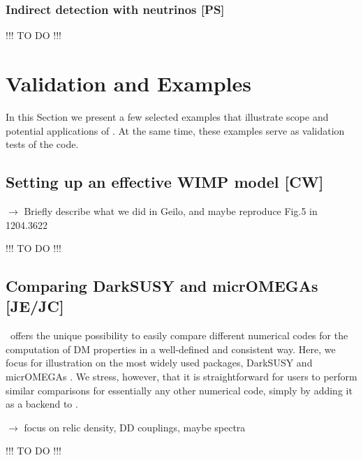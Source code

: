 \subsubsection{Indirect detection with neutrinos {\bf [PS]}}
\label{code_nu}
\smallskip
{\color{red} !!! TO DO !!!}
\smallskip




\section{Validation and  Examples}
\label{examples}

In this Section we present a few selected  examples that illustrate scope and
potential applications of \DB. At the same time, these examples serve as validation
tests of the code.


\subsection{Setting up an effective WIMP model {\bf [CW]}}

$\to$ Briefly describe what we did in Geilo, and maybe reproduce Fig.5 in 1204.3622

\smallskip
{\color{red} !!! TO DO !!!}
\smallskip


\subsection{Comparing {\sf DarkSUSY} and {\sf micrOMEGAs} {\bf [JE/JC]}}

\DB\ offers the unique possibility to easily compare different numerical codes for the computation of DM properties
in a well-defined and consistent way. Here, we focus for illustration on the most widely used packages, {\sf DarkSUSY} 
\cite{xxx} and {\sf micrOMEGAs} \cite{xxx}. We stress, however, that it is straightforward for users to 
perform similar comparisons for essentially any other numerical code, simply by adding it as a backend to \DB.

\medskip
$\to$ focus on relic density, DD couplings, maybe spectra

\smallskip
{\color{red} !!! TO DO !!!}
\smallskip



